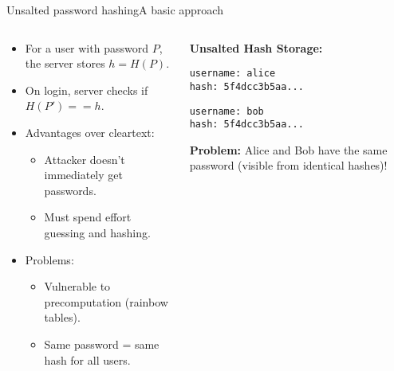\documentclass[aspectratio=169, lualatex, handout]{beamer}
\begin{document}
\begin{frame}{Unsalted password hashing}{A basic approach}
	\begin{columns}[c]
		\begin{column}{0.55\textwidth}
			\begin{itemize}[<+->]
				\item For a user with password $P$, the server stores $h = H(P)$.
				\item On login, server checks if $H(P') == h$.
				\item Advantages over cleartext:
				      \begin{itemize}
					      \item Attacker doesn't immediately get passwords.
					      \item Must spend effort guessing and hashing.
				      \end{itemize}
				\item Problems:
				      \begin{itemize}
					      \item Vulnerable to precomputation (rainbow tables).
					      \item Same password = same hash for all users.
				      \end{itemize}
			\end{itemize}
		\end{column}
		\begin{column}{0.45\textwidth}
			\begin{tcolorbox}[colback=black!5!white,colframe=ciphergray]
				\textbf{Unsalted Hash Storage:}

				\vspace{0.2cm}

				\texttt{username: alice}\\
				\texttt{hash: 5f4dcc3b5aa...}

				\vspace{0.2cm}

				\texttt{username: bob}\\
				\texttt{hash: 5f4dcc3b5aa...}

				\vspace{0.3cm}

				\textcolor{cipherprimary}{\textbf{Problem:} \small Alice and Bob have the same password (visible from identical hashes)!}
			\end{tcolorbox}
		\end{column}
	\end{columns}
\end{frame}
\end{document}
